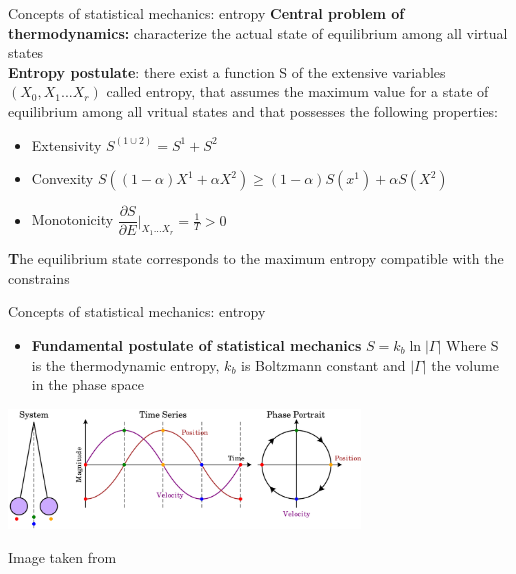 \documentclass{beamer}
\begin{document}
\begin{frame}{Concepts of statistical mechanics: entropy \cite{peliti2011statistical}}
\textbf{Central problem of thermodynamics:} characterize the actual state of equilibrium among all virtual states  \\
\textbf{Entropy postulate}: there exist a function S of the extensive variables $(X_{0},X_{1}...X_{r})$ called entropy,  that assumes the maximum value for a state of equilibrium among all vritual states and that possesses the following properties:
\begin{itemize}
\item Extensivity $S^{(1\cup2)}=S^{1}+S^{2}$
\item Convexity $S((1-\alpha)X^{1}+\alpha X^{2}) \geq (1-\alpha)S(x^{1})+\alpha S(X^{2})$
\item Monotonicity $\dfrac{\partial S}{\partial E}|_{X_{1}...X_{r}}=\frac{1}{T}>0$
\end{itemize}
\textbf The equilibrium state corresponds to the maximum entropy compatible with the constrains

\end{frame}


\begin{frame}{Concepts of statistical mechanics: entropy \cite{peliti2011statistical}}

\begin{itemize}
\item \textbf{Fundamental postulate of statistical mechanics} $S=k_{b}\ln|\Gamma|$ Where S is the thermodynamic entropy,  $k_{b}$ is Boltzmann constant and $|\Gamma|$ the volume in the phase space
\end{itemize}

 \begin{center}
     \includegraphics[width=0.7\textwidth]{Pic/Pendulum_phase_portrait_illustration.png}
\end{center}
\begin{center}
Image taken from \cite{PBC}
\end{center}




\end{frame}
\end{document}
